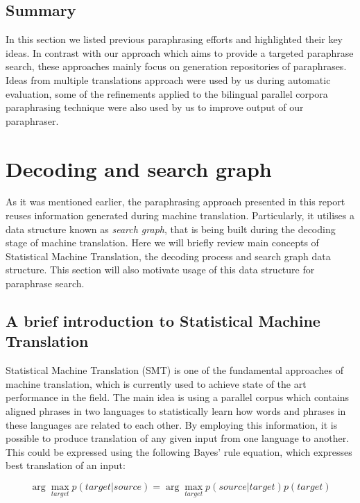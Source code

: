 \subsection{Summary}

In this section we listed previous paraphrasing efforts and highlighted their key ideas. In contrast with our approach which aims to provide a targeted paraphrase search, these approaches mainly focus on generation repositories of paraphrases. Ideas from multiple translations approach were used by us during automatic evaluation, some of the refinements applied to the bilingual parallel corpora paraphrasing technique were also used by us to improve output of our paraphraser.



\section{Decoding and search graph}

As it was mentioned earlier, the paraphrasing approach presented in this report reuses information generated during machine translation. Particularly, it utilises a data structure known as \textit{search graph}, that is being built during the decoding stage of machine translation. Here we will briefly review main concepts of Statistical Machine Translation, the decoding process and search graph data structure. This section will also motivate usage of this data structure for paraphrase search.

\subsection{A brief introduction to Statistical Machine Translation} 

Statistical Machine Translation (SMT) is one of the fundamental approaches of machine translation, which is currently used to achieve state of the art performance in the field. The main idea is using a parallel corpus which contains aligned phrases in two languages to statistically learn how words and phrases in these languages are related to each other. By employing this information, it is possible to produce translation of any given input from one language to another. This could be expressed using the following Bayes' rule equation, which expresses best translation of an input:

\begin{large}
\begin{equation}
\arg \max_{target} p(target|source) = \arg \max_{target} p(source|target)p(target)
\end{equation}
\end{large}

